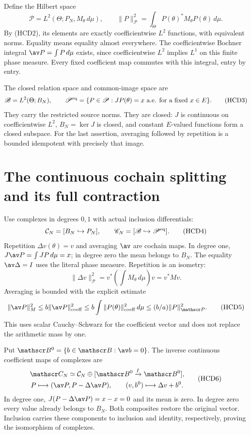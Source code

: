 Define the Hilbert space
\[
 \mathscr P=L^2(\Theta;P_N,M_\theta\,d\mu),\qquad
 \|P\|_{\mathscr P}^2=\int_\Theta P(\theta)^*M_\theta
 P(\theta)\,d\mu.
\]
By (HCD2), its elements are exactly coefficientwise $L^2$
functions, with equivalent norms. Equality means equality
almost everywhere. The coefficientwise Bochner integral
$\av P=\int P\,d\mu$ exists, since coefficientwise $L^2$
implies $L^1$ on this finite phase measure. Every fixed
coefficient map commutes with this integral, entry by entry.

The closed relation space and common-image space are
\[
 \mathscr B=L^2(\Theta;B_N),\qquad
 \mathscr P^{\rm eq}
 =\{P\in\mathscr P:JP(\theta)=x\text{ a.e. for a fixed }x\in E\}.
 \tag{HCD3}
\]
They carry the restricted source norms. They are closed:
$J$ is continuous on coefficientwise $L^2$, $B_N=\ker J$
is closed, and constant $E$-valued functions form a closed
subspace. For the last assertion, averaging followed by
repetition is a bounded idempotent with precisely that image.

\section{The continuous cochain splitting and its full contraction}

Use complexes in degrees $0,1$ with actual inclusion differentials:
\[
 \mathcal C_N=[B_N\hookrightarrow P_N],\qquad
 \mathscr C_N=[\mathscr B\hookrightarrow\mathscr P^{\rm eq}].
 \tag{HCD4}
\]
Repetition $\Delta v(\theta)=v$ and averaging $\av$ are cochain
maps. In degree one, $J\av P=\int JP\,d\mu=x$; in degree
zero the mean belongs to $B_N$. The equality $\av\Delta=I$
uses the literal phase measure. Repetition is an isometry:
\[
 \|\Delta v\|_{\mathscr P}^2
 =v^*\left(\int M_\theta\,d\mu\right)v=v^*Mv.
\]
Averaging is bounded with the explicit estimate
\[
 \|\av P\|_M^2
 \le b\|\av P\|_{\rm coeff}^2
 \le b\int\|P(\theta)\|_{\rm coeff}^2\,d\mu
 \le (b/a)\|P\|_{\mathscr P}^2.
 \tag{HCD5}
\]
This uses scalar Cauchy--Schwarz for the coefficient vector
and does not replace the arithmetic mass by one.

Put $\mathscr B^0=\{b\in\mathscr B:\av b=0\}$. The inverse
continuous coefficient maps of complexes are
\[
 \begin{gathered}
 \mathscr C_N\simeq
 \mathcal C_N\oplus[\mathscr B^0\xrightarrow{I}\mathscr B^0],\\
 P\longmapsto(\av P,P-\Delta\av P),\qquad
 (v,b^0)\longmapsto\Delta v+b^0.
 \end{gathered}
 \tag{HCD6}
\]
In degree one, $J(P-\Delta\av P)=x-x=0$ and its mean is
zero. In degree zero every value already belongs to $B_N$.
Both composites restore the original vector. Inclusion
carries these components to inclusion and identity,
respectively, proving the isomorphism of complexes.

